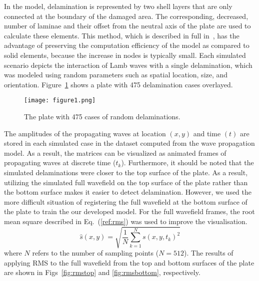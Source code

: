 \documentclass[runningheads]{llncs}
\begin{document}
In the model, delamination is represented by two shell layers that are only connected at the boundary of the damaged area.
The corresponding, decreased, number of laminae and their offset from the neutral axis of the plate are used to calculate these elements.
This method, which is described in full in~\cite{Kudela2009}, has the advantage of preserving the computation efficiency of the model as compared to solid elements, because the increase in nodes is typically small.
Each simulated scenario depicts the interaction of Lamb waves with a single delamination, which was modeled using random parameters such as spatial location, size, and orientation.
Figure~\ref{fig:rand_delaminations} shows a plate with 475 delamination cases overlayed.
\begin{figure} [h!]
	\begin{center}
		\texttt{[image: figure1.png]}
	\end{center}
	\caption{The plate with 475 cases of random delaminations.} 
	\label{fig:rand_delaminations}
\end{figure}
The amplitudes of the propagating waves at location \((x,y)\) and time \((t)\) are stored in each simulated case in the dataset computed from the wave propagation model.
As a result, the matrices can be visualized as animated frames of propagating waves at discrete time (\(t_k\)).
Furthermore, it should be noted that the simulated delaminations were closer to the top surface of the plate.
As a result, utilizing the simulated full wavefield on the top surface of the plate rather than the bottom surface makes it easier to detect delamination.
However, we used the more difficult situation of registering the full wavefield at the bottom surface of the plate to train the our developed model.
For the full wavefield frames, the root mean square described in Eq.~(\ref{ref:rms}) was used to improve the visualisation.
\begin{equation}
	\hat{s}(x,y) = \sqrt{\frac{1}{N}\sum_{k=1}^{N} s(x,y,t_k)^2}
	\label{ref:rms}
\end{equation}
where \(N\) refers to the number of sampling points (\(N=512\)).
The results of applying RMS to the full wavefield from the top and bottom surfaces of the plate are shown in Figs~\ref{fig:rmstop} and \ref{fig:rmsbottom}, respectively.
\end{document}
